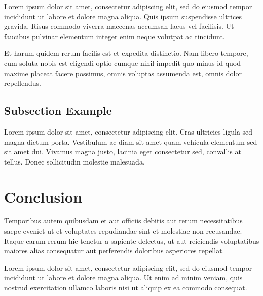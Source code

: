 \documentclass[12pt,a4paper]{article}
\begin{document}
Lorem ipsum dolor sit amet, consectetur adipiscing elit, sed do eiusmod tempor incididunt ut labore et dolore magna aliqua. Quis ipsum suspendisse ultrices gravida. Risus commodo viverra maecenas accumsan lacus vel facilisis. Ut faucibus pulvinar elementum integer enim neque volutpat ac tincidunt.

Et harum quidem rerum facilis est et expedita distinctio. Nam libero tempore, cum soluta nobis est eligendi optio cumque nihil impedit quo minus id quod maxime placeat facere possimus, omnis voluptas assumenda est, omnis dolor repellendus.

\subsection{Subsection Example}

Lorem ipsum dolor sit amet, consectetur adipiscing elit. Cras ultricies ligula sed magna dictum porta. Vestibulum ac diam sit amet quam vehicula elementum sed sit amet dui. Vivamus magna justo, lacinia eget consectetur sed, convallis at tellus. Donec sollicitudin molestie malesuada.

\section{Conclusion}

Temporibus autem quibusdam et aut officiis debitis aut rerum necessitatibus saepe eveniet ut et voluptates repudiandae sint et molestiae non recusandae. Itaque earum rerum hic tenetur a sapiente delectus, ut aut reiciendis voluptatibus maiores alias consequatur aut perferendis doloribus asperiores repellat.

Lorem ipsum dolor sit amet, consectetur adipiscing elit, sed do eiusmod tempor incididunt ut labore et dolore magna aliqua. Ut enim ad minim veniam, quis nostrud exercitation ullamco laboris nisi ut aliquip ex ea commodo consequat.
\end{document}
